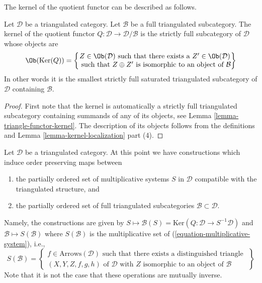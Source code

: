 \noindent
The kernel of the quotient functor can be described as follows.

\begin{lemma}
\label{lemma-kernel-quotient}
Let $\mathcal{D}$ be a triangulated category.
Let $\mathcal{B}$ be a full triangulated subcategory.
The kernel of the quotient functor
$Q : \mathcal{D} \to \mathcal{D}/\mathcal{B}$
is the strictly full subcategory of $\mathcal{D}$ whose objects are
$$
\Ob(\text{Ker}(Q)) =
\left\{
\begin{matrix}
Z \in \Ob(\mathcal{D})
\text{ such that there exists a }Z' \in \Ob(\mathcal{D}) \\
\text{ such that }Z \oplus Z'\text{ is isomorphic to an object of }\mathcal{B}
\end{matrix}
\right\}
$$
In other words it is the smallest strictly full saturated triangulated
subcategory of $\mathcal{D}$ containing $\mathcal{B}$.
\end{lemma}

\begin{proof}
First note that the kernel is automatically a strictly full
triangulated subcategory containing summands of any of its objects, see
Lemma \ref{lemma-triangle-functor-kernel}.
The description of its objects follows from the definitions and
Lemma \ref{lemma-kernel-localization} part (4).
\end{proof}

\noindent
Let $\mathcal{D}$ be a triangulated category.
At this point we have constructions which induce order
preserving maps between
\begin{enumerate}
\item the partially ordered set of multiplicative systems $S$ in $\mathcal{D}$
compatible with the triangulated structure, and
\item the partially ordered set of full triangulated subcategories
$\mathcal{B} \subset \mathcal{D}$.
\end{enumerate}
Namely, the constructions are given by
$S \mapsto \mathcal{B}(S) = \text{Ker}(Q : \mathcal{D} \to S^{-1}\mathcal{D})$
and $\mathcal{B} \mapsto S(\mathcal{B})$
where $S(\mathcal{B})$ is the multiplicative set of
(\ref{equation-multiplicative-system}), i.e.,
$$
S(\mathcal{B}) =
\left\{
\begin{matrix}
f \in \text{Arrows}(\mathcal{D})
\text{ such that there exists a distinguished triangle }\\
(X, Y, Z, f, g, h) \text{ of }\mathcal{D}\text{ with }
Z\text{ isomorphic to an object of }\mathcal{B}
\end{matrix}
\right\}
$$
Note that it is not the case that these operations are mutually inverse.

